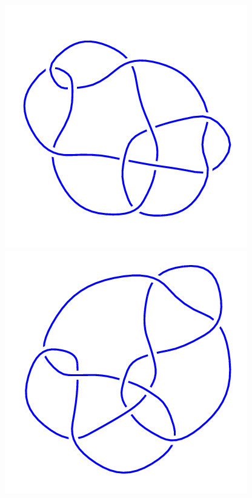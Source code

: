 \begin{figure}[H]
    \begin{minipage}[b]{.18\linewidth}
        \centering
        \includegraphics[width=\linewidth]{../data/10_87.png}
    \end{minipage}
    \begin{minipage}[b]{.18\linewidth}
        \centering
        \includegraphics[width=\linewidth]{../data/10_88.png}

\end{minipage}
\end{figure}
